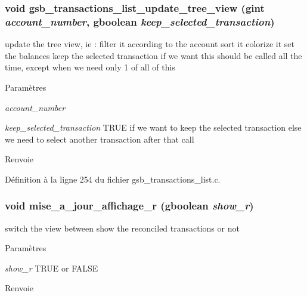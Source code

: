 \subsubsection[{gsb\_\-transactions\_\-list\_\-update\_\-tree\_\-view}]{\setlength{\rightskip}{0pt plus 5cm}void gsb\_\-transactions\_\-list\_\-update\_\-tree\_\-view (gint {\em account\_\-number}, \/  gboolean {\em keep\_\-selected\_\-transaction})}\label{gsb__transactions__list_8h_ab7d08f59bcf7149edda9db47e67333a4}
update the tree view, ie : filter it according to the account sort it colorize it set the balances keep the selected transaction if we want this should be called all the time, except when we need only 1 of all of this


\begin{DoxyParams}{Paramètres}
\item[{\em account\_\-number}]\item[{\em keep\_\-selected\_\-transaction}]TRUE if we want to keep the selected transaction else we need to select another transaction after that call\end{DoxyParams}
\begin{DoxyReturn}{Renvoie}

\end{DoxyReturn}


Définition à la ligne 254 du fichier gsb\_\-transactions\_\-list.c.

\subsubsection[{mise\_\-a\_\-jour\_\-affichage\_\-r}]{\setlength{\rightskip}{0pt plus 5cm}void mise\_\-a\_\-jour\_\-affichage\_\-r (gboolean {\em show\_\-r})}\label{gsb__transactions__list_8h_a7885778abe9c7b1213f7f0485e666413}
switch the view between show the reconciled transactions or not


\begin{DoxyParams}{Paramètres}
\item[{\em show\_\-r}]TRUE or FALSE\end{DoxyParams}
\begin{DoxyReturn}{Renvoie}

\end{DoxyReturn}


